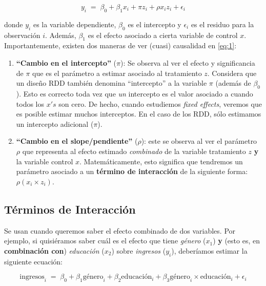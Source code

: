\documentclass[10pt]{article}
\begin{document}
\begin{equation}\label{eq:1}
y_{i} \;=\; \beta_{0} + \beta_{1}x_{i} + \pi z_{i} + \rho x_{i}z_{i} + \epsilon_{i}
\end{equation}

donde $y_{i}$ es la variable dependiente, $\beta_{0}$ es el intercepto y $\epsilon_{i}$ es el residuo para la observaci\'on $i$. Adem\'as, $\beta_{1}$ es el efecto asociado a cierta variable de control $x$. Importantemente, existen dos maneras de ver (cuasi) causalidad en \autoref{eq:1}:

\begin{enumerate}
	\item {\bf ``Cambio en el intercepto''} ($\pi$): Se observa al ver el efecto y significancia de $\pi$ que es el par\'ametro a estimar asociado al tratamiento $z$. Considera que un dise\~no RDD tambi\'en denomina ``intercepto'' a la variable $\pi$ (adem\'as de $\beta_{0}$). Esto es correcto toda vez que \emph{un} intercepto es el valor asociado a cuando todos los $x's $ son cero. De hecho, cuando estudiemos \emph{fixed effects}, veremos que es posible estimar muchos interceptos. En el caso de los RDD, s\'olo estimamos un intercepto adicional ($\pi$).

	\item  {\bf ``Cambio en el slope/pendiente''} ($\rho$): este se observa al ver el par\'ametro $\rho$ que representa al efecto estimado \emph{combinado} de la variable tratamiento $z$ {\bf y} la variable control $x$. Matem\'aticamente, esto significa que tendremos un par\'ametro asociado a un {\bf t\'ermino de interacci\'on} de la siguiente forma: $\rho(x_{i}\times z_{i})$. 
\end{enumerate}

\subsection*{T\'erminos de Interacci\'on}

Se usan cuando queremos saber el efecto combinado de dos variables. Por ejemplo, si quisi\'eramos saber cu\'al es el efecto que tiene \emph{g\'enero} ($x_{1}$) {\bf y} (esto es, en {\bf combinaci\'on con}) \emph{educaci\'on} ($x_{2}$) sobre \emph{ingresos} ($y_{i}$), deber\'iamos estimar la siguiente ecuaci\'on:

		\begin{equation}\label{eq:int:term}
			\text{ingresos}_{i} \;=\; \beta_{0} + \beta_{1}\text{g\'enero}_{i} + \beta_{2}\text{educaci\'on}_{i} + \beta_{3}{\text{g\'enero}}_{i}\times \text{educaci\'on}_{i} + \epsilon_{i}
		\end{equation}
\end{document}
